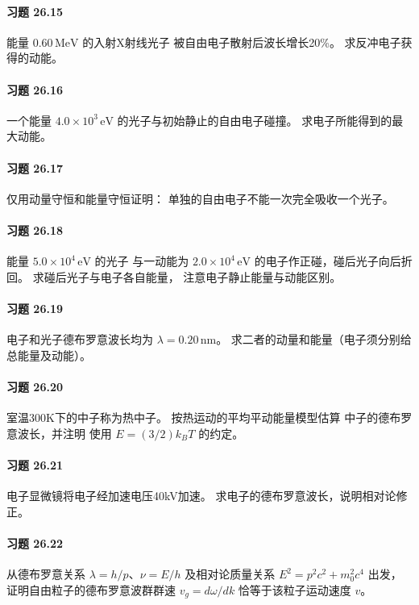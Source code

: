 \paragraph{习题 26.15}
能量 \(0.60\,\mathrm{MeV}\) 的入射X射线光子
被自由电子散射后波长增长20\%。
求反冲电子获得的动能。
\paragraph{习题 26.16}
一个能量 \(4.0\times10^3\,\mathrm{eV}\)
的光子与初始静止的自由电子碰撞。
求电子所能得到的最大动能。
\paragraph{习题 26.17}
仅用动量守恒和能量守恒证明：
单独的自由电子不能一次完全吸收一个光子。
\paragraph{习题 26.18}
能量 \(5.0\times10^4\,\mathrm{eV}\) 的光子
与一动能为 \(2.0\times10^4\,\mathrm{eV}\)
的电子作正碰，碰后光子向后折回。
求碰后光子与电子各自能量，
注意电子静止能量与动能区别。
\paragraph{习题 26.19}
电子和光子德布罗意波长均为
\(\lambda=0.20\,\mathrm{nm}\)。
求二者的动量和能量（电子须分别给总能量及动能）。
\paragraph{习题 26.20}
室温300K下的中子称为热中子。
按热运动的平均平动能量模型估算
中子的德布罗意波长，并注明
使用 \(E=(3/2)k_BT\) 的约定。
\paragraph{习题 26.21}
电子显微镜将电子经加速电压40kV加速。
求电子的德布罗意波长，说明相对论修正。
\paragraph{习题 26.22}
从德布罗意关系
\(\lambda=h/p\)、\(\nu=E/h\)
及相对论质量关系 \(E^2=p^2c^2+m_0^2c^4\)
出发，证明自由粒子的德布罗意波群群速
\(v_g=d\omega/dk\) 恰等于该粒子运动速度 \(v\)。
